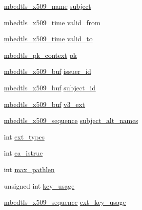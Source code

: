 \begin{DoxyCompactItemize}
\item 
\mbox{\hyperlink{group__x509__module_ga2272228c7776102328df31623af3168c}{mbedtls\+\_\+x509\+\_\+name}} \mbox{\hyperlink{structmbedtls__x509__crt_a773e92423092ab65e5e50031bd9663a5}{subject}}
\item 
\mbox{\hyperlink{structmbedtls__x509__time}{mbedtls\+\_\+x509\+\_\+time}} \mbox{\hyperlink{structmbedtls__x509__crt_aad3cad5d228545a1950850239741784f}{valid\+\_\+from}}
\item 
\mbox{\hyperlink{structmbedtls__x509__time}{mbedtls\+\_\+x509\+\_\+time}} \mbox{\hyperlink{structmbedtls__x509__crt_a05af94003d5948703ca537b6a5f2d5b4}{valid\+\_\+to}}
\item 
\mbox{\hyperlink{structmbedtls__pk__context}{mbedtls\+\_\+pk\+\_\+context}} \mbox{\hyperlink{structmbedtls__x509__crt_a64f66291338e6b230542d83035fe5f20}{pk}}
\item 
\mbox{\hyperlink{group__x509__module_ga4d02c9e8e4e2934555e0d132cd2976dc}{mbedtls\+\_\+x509\+\_\+buf}} \mbox{\hyperlink{structmbedtls__x509__crt_a6bb2a7142b718fa43b948770ccc98dcd}{issuer\+\_\+id}}
\item 
\mbox{\hyperlink{group__x509__module_ga4d02c9e8e4e2934555e0d132cd2976dc}{mbedtls\+\_\+x509\+\_\+buf}} \mbox{\hyperlink{structmbedtls__x509__crt_adbbaba207a103a73f41b4b72ffc540f5}{subject\+\_\+id}}
\item 
\mbox{\hyperlink{group__x509__module_ga4d02c9e8e4e2934555e0d132cd2976dc}{mbedtls\+\_\+x509\+\_\+buf}} \mbox{\hyperlink{structmbedtls__x509__crt_a6baebf9741097506a60521fbcaf5996b}{v3\+\_\+ext}}
\item 
\mbox{\hyperlink{group__x509__module_gabd52d60a09315854d9ef849d02154f35}{mbedtls\+\_\+x509\+\_\+sequence}} \mbox{\hyperlink{structmbedtls__x509__crt_a1f148e8fb52e03e2604e716386a07df4}{subject\+\_\+alt\+\_\+names}}
\item 
int \mbox{\hyperlink{structmbedtls__x509__crt_a60878e1cb7a3058f19042d8f189158b0}{ext\+\_\+types}}
\item 
int \mbox{\hyperlink{structmbedtls__x509__crt_a196b3a43dae5a1c0058f46075f832890}{ca\+\_\+istrue}}
\item 
int \mbox{\hyperlink{structmbedtls__x509__crt_ab0af43652f426ace28052ec47fdde6fb}{max\+\_\+pathlen}}
\item 
unsigned int \mbox{\hyperlink{structmbedtls__x509__crt_a3b7650600aa6e637b8ab534a938aee94}{key\+\_\+usage}}
\item 
\mbox{\hyperlink{group__x509__module_gabd52d60a09315854d9ef849d02154f35}{mbedtls\+\_\+x509\+\_\+sequence}} \mbox{\hyperlink{structmbedtls__x509__crt_ac94f7360a7143ce1b983fab46c34dcf2}{ext\+\_\+key\+\_\+usage}}

\end{DoxyCompactItemize}
